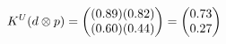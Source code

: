 \documentclass[preview]{standalone}
\begin{document}
\begin{align*}
\special{dvisvgm:raw <g id='unique000'>}K^U(d \otimes p) = \begin{pmatrix} (0.89)(0.82) \\ (0.60)(0.44) \end{pmatrix} = \begin{pmatrix} 0.73 \\ 0.27 \end{pmatrix}\special{dvisvgm:raw </g>}
\end{align*}
\end{document}
